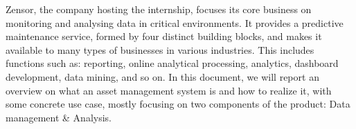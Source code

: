 Zensor, the company hosting the internship, focuses its core business on monitoring and analysing data in critical environments. It provides a predictive maintenance service, formed by four distinct building blocks, and makes it available to many types of businesses in various industries. 
This includes functions such as: reporting, online analytical processing, analytics, dashboard development, data mining, and so on.
In this document, we will report an overview on what an asset management system is and how to realize it, with some concrete use case, mostly focusing on two components of the product: Data management \& Analysis.

\cleardoublepage